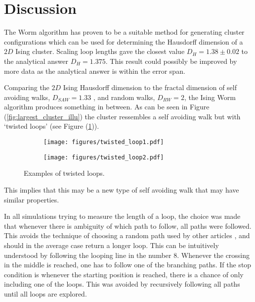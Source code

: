 \section{Discussion}
\label{sec:Discussion}

The Worm algorithm has proven to be a suitable method for generating cluster configurations which can be used for determining the Hausdorff dimension of a $2D$ Ising cluster. Scaling loop lengths gave the closest value $D_H = 1.38 \pm 0.02$ to the analytical answer $D_H = 1.375$\cite{Duplantier:GeoHausdorff}. This result could possibly be improved by more data as the analytical answer is within the error span.

Comparing the $2D$ Ising Hausdorff dimension to the fractal dimension of self avoiding walks, $D_{SAW} = 1.33$ \cite{Vilgis:FlorySAW}, and random walks, $D_{RW} = 2$, the Ising Worm algorithm produces something in between. As can be seen in Figure (\ref{fig:largest_cluster_illu}) the cluster ressembles a self avoiding walk but with `twisted loops' (see Figure (\ref{fig:twisted_loops})).

\begin{figure}[h!]
\centering
    \begin{subfigure}{.4\textwidth}
        \centering
        \texttt{[image: figures/twisted\_loop1.pdf]}
    \end{subfigure}
    \begin{subfigure}{.4\textwidth}
        \centering
        \texttt{[image: figures/twisted\_loop2.pdf]}
    \end{subfigure}
    \caption{Examples of twisted loops.}
\label{fig:twisted_loops}
\end{figure}

This implies that this may be a new type of self avoiding walk that may have similar properties.

In all simulations trying to measure the length of a loop, the choice was made that whenever there is ambiguity of which path to follow, all paths were followed. This avoids the technique of choosing a random path used by other articles \cite{Hove:hausdorff_crit_fluctuations}, and should in the average case return a longer loop. This can be intuitively understood by following the looping line in the number $8$. Whenever the crossing in the middle is reached, one has to follow one of the branching paths. If the stop condition is whenever the starting position is reached, there is a chance of only including one of the loops. This was avoided by recursively following all paths until all loops are explored.

